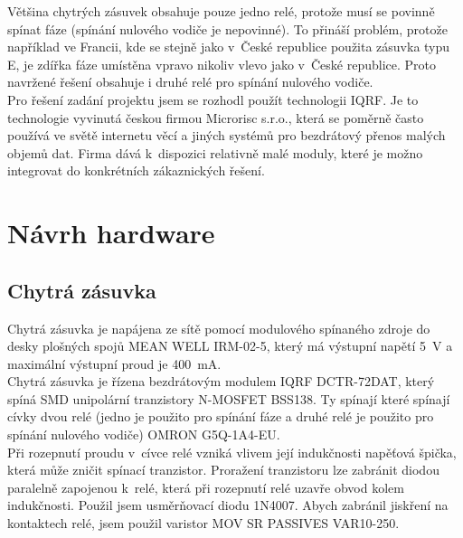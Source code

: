 \documentclass[12pt,a4paper,oneside]{article}
\begin{document}
Většina chytrých zásuvek obsahuje pouze jedno relé\cite{teardown-wemo-switch}, protože musí se povinně spínat fáze (spínání nulového vodiče je nepovinné). To přináší problém, protože například ve Francii, kde se stejně jako v~České republice použita zásuvka typu E\cite{zasuvka-typ-e}, je zdířka fáze umístěna vpravo nikoliv vlevo jako v~České republice\cite{faze-vlevo-nebo-vpravo}. Proto navržené řešení obsahuje i druhé relé pro spínání nulového vodiče. \\

Pro řešení zadání projektu jsem se rozhodl použít technologii IQRF. Je to technologie vyvinutá českou firmou Microrisc s.r.o., která se poměrně často používá ve světě internetu věcí a jiných systémů pro bezdrátový přenos malých objemů dat. Firma dává k~dispozici relativně malé moduly, které je možno integrovat do konkrétních zákaznických řešení.

\newpage

\section{Návrh hardware}

\subsection{Chytrá zásuvka}

Chytrá zásuvka je napájena ze sítě pomocí modulového spínaného zdroje do desky plošných spojů MEAN WELL IRM-02-5, který má výstupní napětí 5~V a maximální výstupní proud je 400~mA. \\

Chytrá zásuvka je řízena bezdrátovým modulem IQRF DCTR-72DAT, který spíná SMD unipolární tranzistory N-MOSFET BSS138. Ty spínají které spínají cívky dvou relé (jedno je použito pro spínání fáze a druhé relé je použito pro spínání nulového vodiče) OMRON G5Q-1A4-EU. \\

Při rozepnutí proudu v~cívce relé vzniká vlivem její indukčnosti napěťová špička, která může zničit spínací tranzistor. Proražení tranzistoru lze zabránit diodou paralelně zapojenou k~relé, která při rozepnutí relé uzavře obvod kolem indukčnosti. Použil jsem usměrňovací diodu 1N4007. Abych zabránil jiskření na kontaktech relé, jsem použil varistor MOV SR PASSIVES VAR10-250.
\end{document}
